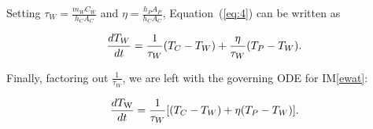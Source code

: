 \documentclass[12pt]{article}
\newcommand{\iref}[1]{IM\ref{#1}}
\begin{document}
\noindent
Setting $\tau_W = \frac{m_W C_W}{h_C A_C}$ and $\eta = \frac{h_P A_P}{h_C A_C}$, 
Equation~(\ref{eq:4}) can be written as

\begin{equation*}
\\ \frac{dT_W}{dt} = \frac{1}{\tau_W} (T_C - T_W) + 
\frac{\eta}{\tau_W}(T_P - T_W).
\end{equation*}

\noindent
Finally, factoring out $\frac{1}{\tau_W}$, we are left with the governing ODE for \iref{ewat}:

\begin{equation*}
\\ \frac{dT_{\mathrm{W}}}{dt} = \frac{1}{\tau_W} [(T_C - T_W) + 
{\eta}(T_P - T_W)].
\end{equation*}

~\newline

\end{document}
